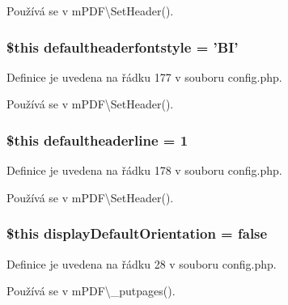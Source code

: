 Používá se v m\-P\-D\-F\textbackslash{}\-Set\-Header().

\hypertarget{config_8php_ae9b7882a698124ad57d7a3b5c110845a}{
\subsubsection[{defaultheaderfontstyle}]{\setlength{\rightskip}{0pt plus 5cm}\$this defaultheaderfontstyle = 'B\-I'}}\label{config_8php_ae9b7882a698124ad57d7a3b5c110845a}


Definice je uvedena na řádku 177 v souboru config.\-php.



Používá se v m\-P\-D\-F\textbackslash{}\-Set\-Header().

\hypertarget{config_8php_ae0c7711b2bb112bdec75418230ad9c4b}{
\subsubsection[{defaultheaderline}]{\setlength{\rightskip}{0pt plus 5cm}\$this defaultheaderline = 1}}\label{config_8php_ae0c7711b2bb112bdec75418230ad9c4b}


Definice je uvedena na řádku 178 v souboru config.\-php.



Používá se v m\-P\-D\-F\textbackslash{}\-Set\-Header().

\hypertarget{config_8php_a0b6854be26e5908e4df28125200e43ea}{
\subsubsection[{display\-Default\-Orientation}]{\setlength{\rightskip}{0pt plus 5cm}\$this display\-Default\-Orientation = {\bf false}}}\label{config_8php_a0b6854be26e5908e4df28125200e43ea}


Definice je uvedena na řádku 28 v souboru config.\-php.



Používá se v m\-P\-D\-F\textbackslash{}\-\_\-putpages().


